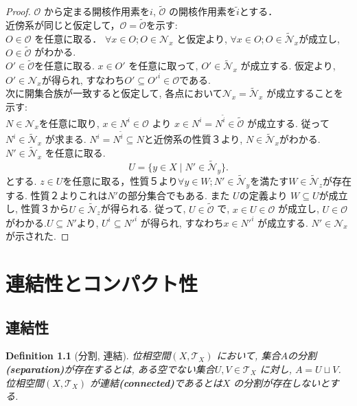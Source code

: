 \documentclass[dvipdfmx]{jbook}
\newtheorem{definition}[theorem]{Definition}
\theoremstyle{remark}
\theoremstyle{plain}
\begin{document}
\begin{proof}
	$\mathcal{O}$ から定まる開核作用素を$i$,  $\tilde{\mathcal{O}}$ の開核作用素を$\tilde{i}$とする．\\
	近傍系が同じと仮定して，$\mathcal{O} = \tilde{\mathcal{O}}$を示す: \\
	$O \in \mathcal{O}$ を任意に取る．
	$\forall x \in O; O \in \mathcal{N}_x$ と仮定より, $\forall x \in O; O \in  \mathcal{\tilde{N}}_x$が成立し, $O \in \tilde{\mathcal{O}}$ がわかる.\\
	$O' \in  \tilde{\mathcal{O}}$を任意に取る. 
	$x \in O'$ を任意に取って, $O' \in  \mathcal{\tilde{N}}_x$ が成立する.
	仮定より, $O' \in \mathcal{N}_x$が得られ, 
すなわち$ O' \subseteq  O'^{i} \in \mathcal{O}$である.\\
	次に開集合族が一致すると仮定して, 各点において$\mathcal{N}_x = \mathcal{\tilde{N}}_x$ が成立することを示す:\\
	$N \in \mathcal{N}_x$を任意に取り, $x \in N^{i} \in \mathcal{O}$ より
	$x \in  N^{i} = N^{\tilde{i}}\in  \tilde{\mathcal{O}}$ が成立する. 
	従って$N^{i} \in \mathcal{\tilde{N}}_x$ が求まる.
	$N^{i} = N^{\tilde{i}} \subseteq N$と近傍系の性質３より, $N \in \mathcal{\tilde{N}}_x$がわかる.\\
	$N' \in \mathcal{\tilde{N}}_x$ を任意に取る. 
	\[
		U =\{y \in X  \mid N' \in \mathcal{\tilde{N}}_y\} 
	.\] 
	とする. $z \in U$を任意に取る，性質５より$\forall y \in W; N' \in \mathcal{\tilde{N}}_y$を満たす$W \in \mathcal{\tilde{N}}_z$が存在する. 性質２よりこれは$N'$の部分集合でもある. また $U$の定義より $W \subseteq U$が成立し, 性質３から$U \in \mathcal{\tilde{N}}_z$が得られる. 従って, $U \in \tilde{\mathcal{O}}$ で, $x \in U \in \mathcal{O}$ が成立し, $U \in \mathcal{O}$ がわかる.$U \subseteq N'$より, $U^{i} \subseteq N'^{i}$ が得られ, すなわち$x \in N'^{i}$ が成立する. $N' \in \mathcal{N}_x$が示された.
\end{proof}

\chapter{連結性とコンパクト性}%
\label{cha:連結性とコンパクト性}


\section{連結性}

\begin{definition}[分割, 連結]
	位相空間$\left( X , \mathcal{T}_X \right) $ において, 集合$A$の分割\textbf{(separation)}が存在するとは, ある空でない集合$U,V \in \mathcal{T}_X$ に対し, $A=U \sqcup   V $. 位相空間$\left( X,\mathcal{T}_X \right) $ が連結\textbf{(connected)}であるとは$X$ の分割が存在しないとする.
\end{definition} 
\end{document}
